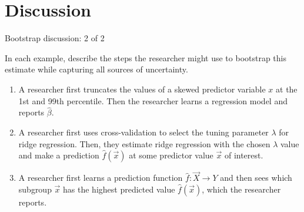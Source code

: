 \documentclass{beamer}
\begin{document}
\section{Discussion}


\begin{frame}{Bootstrap discussion: 2 of 2}

In each example, describe the steps the researcher might use to bootstrap this estimate while capturing all sources of uncertainty.

\begin{enumerate}
\item A researcher first truncates the values of a skewed predictor variable $x$ at the 1st and 99th percentile. Then the researcher learns a regression model and reports $\hat\beta$. \pause
\item A researcher first uses cross-validation to select the tuning parameter $\lambda$ for ridge regression. Then, they estimate ridge regression with the chosen $\lambda$ value and make a prediction $\hat{f}(\vec{x})$ at some predictor value $\vec{x}$ of interest. \pause
\item A researcher first learns a prediction function $\hat{f}:\vec{X}\rightarrow Y$ and then sees which subgroup $\vec{x}$ has the highest predicted value $\hat{f}(\vec{x})$, which the researcher reports.
\end{enumerate}

\end{frame}
\end{document}
